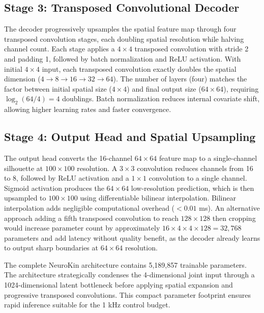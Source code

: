 \documentclass[12pt,a4paper,oneside]{report}
\begin{document}
\subsection{Stage 3: Transposed Convolutional Decoder}
\label{subsec:stage_3_transposed_convolutional_decoder}

The decoder progressively upsamples the spatial feature map through four transposed convolution stages, each doubling spatial resolution while halving channel count. Each stage applies a $4 \times 4$ transposed convolution with stride 2 and padding 1, followed by batch normalization and ReLU activation. With initial $4 \times 4$ input, each transposed convolution exactly doubles the spatial dimension ($4 \rightarrow 8 \rightarrow 16 \rightarrow 32 \rightarrow 64$). The number of layers (four) matches the factor between initial spatial size ($4 \times 4$) and final output size ($64 \times 64$), requiring $\log_2(64/4) = 4$ doublings. Batch normalization reduces internal covariate shift, allowing higher learning rates and faster convergence.

\subsection{Stage 4: Output Head and Spatial Upsampling}
\label{subsec:stage_4_output_head_and_spatial_upsampling}

The output head converts the 16-channel $64 \times 64$ feature map to a single-channel silhouette at $100 \times 100$ resolution. A $3 \times 3$ convolution reduces channels from 16 to 8, followed by ReLU activation and a $1 \times 1$ convolution to a single channel. Sigmoid activation produces the $64 \times 64$ low-resolution prediction, which is then upsampled to $100 \times 100$ using differentiable bilinear interpolation. Bilinear interpolation adds negligible computational overhead ($<0.01$ ms). An alternative approach adding a fifth transposed convolution to reach $128 \times 128$ then cropping would increase parameter count by approximately $16 \times 4 \times 4 \times 128 = 32,768$ parameters and add latency without quality benefit, as the decoder already learns to output sharp boundaries at $64 \times 64$ resolution.

The complete NeuroKin architecture contains 5,189,857 trainable parameters. The architecture strategically condenses the 4-dimensional joint input through a 1024-dimensional latent bottleneck before applying spatial expansion and progressive transposed convolutions. This compact parameter footprint ensures rapid inference suitable for the 1 kHz control budget.
\end{document}
